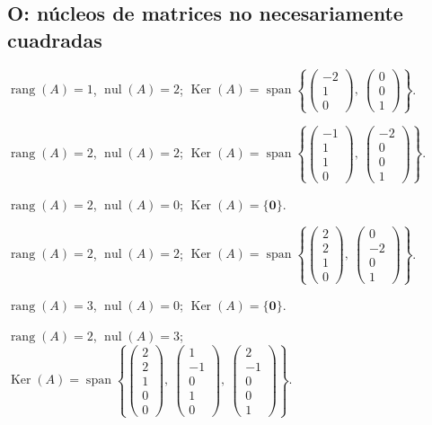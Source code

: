 \documentclass[12pt]{article}
\theoremstyle{remark}
\newcommand{\rang}{\operatorname{rang}}
\newcommand{\nul}{\operatorname{nul}}
\newcommand{\Ker}{\operatorname{Ker}}
\newcommand{\vect}[1]{\boldsymbol{#1}}
\begin{document}
\subsection*{O: núcleos de matrices no necesariamente cuadradas}
\begin{description}[style=nextline,leftmargin=3em,itemsep=0.45em]
\item[E213.] $\rang(A)=1$, $\nul(A)=2$; $\Ker(A)=\operatorname{span}\left\{\begin{pmatrix}-2\\1\\0\end{pmatrix},\ \begin{pmatrix}0\\0\\1\end{pmatrix}\right\}$. 
\item[E214.] $\rang(A)=2$, $\nul(A)=2$; $\Ker(A)=\operatorname{span}\left\{\begin{pmatrix}-1\\1\\1\\0\end{pmatrix},\ \begin{pmatrix}-2\\0\\0\\1\end{pmatrix}\right\}$. 
\item[E215.] $\rang(A)=2$, $\nul(A)=0$; $\Ker(A)=\{\vect0\}$. 
\item[E216.] $\rang(A)=2$, $\nul(A)=2$; $\Ker(A)=\operatorname{span}\left\{\begin{pmatrix}2\\2\\1\\0\end{pmatrix},\ \begin{pmatrix}0\\-2\\0\\1\end{pmatrix}\right\}$. 
\item[E217.] $\rang(A)=3$, $\nul(A)=0$; $\Ker(A)=\{\vect0\}$. 
\item[E218.] $\rang(A)=2$, $\nul(A)=3$; $\Ker(A)=\operatorname{span}\left\{\begin{pmatrix}2\\2\\1\\0\\0\end{pmatrix},\ \begin{pmatrix}1\\-1\\0\\1\\0\end{pmatrix},\ \begin{pmatrix}2\\-1\\0\\0\\1\end{pmatrix}\right\}$. 

\end{description}
\end{document}
